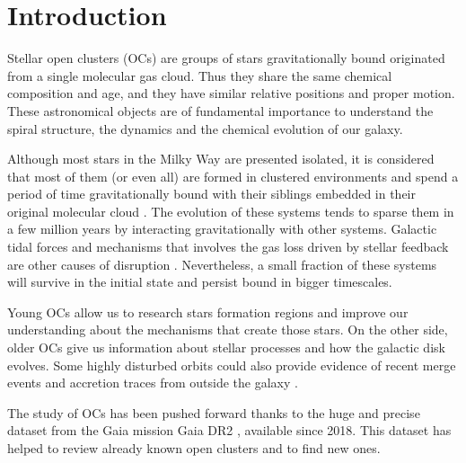 \documentclass[11pt, a4paper, english]{book}
\begin{document}
\mainmatter
\chapter{Introduction}







Stellar open clusters (OCs) \cite{janes1982open} are groups of stars gravitationally bound originated from a single molecular gas cloud.
Thus they share the same chemical composition and age, and they have similar relative positions and proper motion.
These astronomical objects are of fundamental importance to understand the spiral structure,
the dynamics and the chemical evolution of our galaxy.

Although most stars in the Milky Way are presented isolated, it is considered that most of them (or even all)
are formed in clustered environments and spend a period of time gravitationally bound with their siblings embedded
in their original molecular cloud
\cite{clarke2000theformationofstellarclusters} \cite{portegies2010young}.
The evolution of these systems tends to sparse them in a few million years by interacting gravitationally with other systems.
Galactic tidal forces and mechanisms that involves the gas loss driven by stellar feedback are other causes of disruption
\cite{brinkmann2017bound}.
Nevertheless, a small fraction of these systems will survive in the initial state and persist bound in bigger timescales.

Young OCs allow us to research stars formation regions and improve our understanding about the mechanisms that create those stars.
On the other side, older OCs give us information about stellar processes and how the galactic disk evolves.
Some highly disturbed orbits could also provide evidence of recent merge events and accretion traces from outside the galaxy
\cite{cantat2016abundances}.

The study of OCs has been pushed forward thanks to the huge and precise dataset from the Gaia mission
\cite{collaboration2016description} Gaia DR2 \cite{gaia2018gaia}, available since 2018.
This dataset has helped to review already known open clusters and to find new ones.
\end{document}
